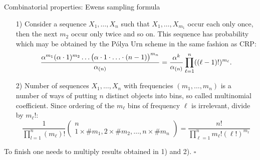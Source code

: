 \begin{frame}[allowframebreaks]{Combinatorial properties: Ewens sampling formula}
\begin{itemize}
    \item[1)] Consider a sequence $X_1,\ldots, X_n$ such that $X_1, \ldots, X_{m_1}$ occur each only once, then the next $m_2$ occur only twice and so on. This sequence has probability which may be obtained by the P\'olya Urn scheme in the same fashion as CRP:
    \begin{equation*}
        \frac{\alpha^{m_1} (\alpha \cdot 1)^{m_2} \ldots \big( \alpha \cdot 1 \cdot\ldots \cdot (n-1) \big)^{m_n}  }{\alpha_{(n)}}=\frac{\alpha^k}{\alpha_{(n)}}\prod_{\ell=1}^n ((\ell-1)!)^{m_\ell}.
    \end{equation*}
    \item[2)] Number of sequences $X_1,\ldots,X_n$ with frequencies $(m_1, \ldots, m_n)$ is a number of ways of putting $n$ distinct objects into bins, so called multinomial coefficient. Since ordering of the $m_\ell$ bins of frequency $\ell$ is irrelevant,  divide by $m_\ell!$:
    \begin{equation*}
        \frac{1}{\prod_{l=1}^n (m_\ell)!}
        \begin{pmatrix}
n\\ 
1\times \# m_1, 2\times \# m_2, \ldots, n\times \# m_n
\end{pmatrix}
= \frac{n!}{\prod_{\ell=1}^n m_\ell!(\ell!)^{m_\ell}}
    \end{equation*}
\end{itemize}
To finish one needs to multiply results obtained in 1) and 2). \hfill $\square$
\end{frame}





